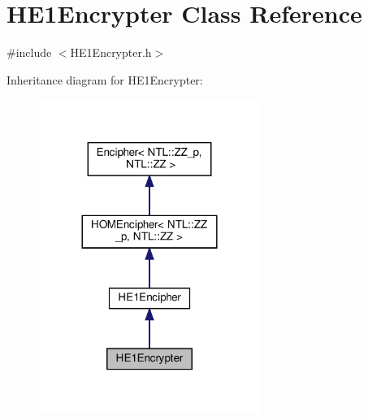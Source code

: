 \hypertarget{classHE1Encrypter}{}\section{H\+E1\+Encrypter Class Reference}
\label{classHE1Encrypter}


{\ttfamily \#include $<$H\+E1\+Encrypter.\+h$>$}



Inheritance diagram for H\+E1\+Encrypter\+:\nopagebreak
\begin{figure}[H]
\begin{center}
\leavevmode
\includegraphics[width=204pt]{classHE1Encrypter__inherit__graph}
\end{center}
\end{figure}


